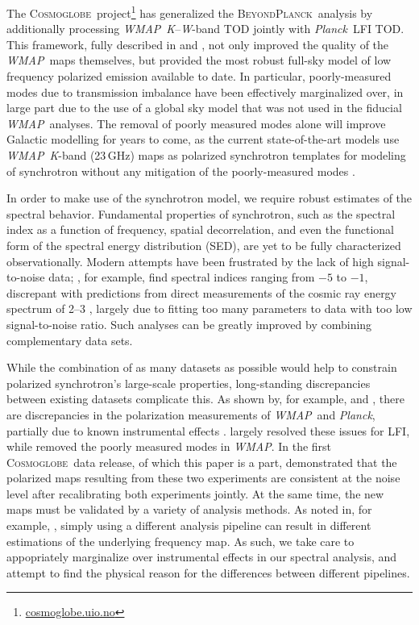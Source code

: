 \documentclass[twocolumn]{../../common/aa}
\def\WMAP{\emph{WMAP}}
\def\Planck{\emph{Planck}}
\newcommand{\bp}{\textsc{BeyondPlanck}}
\newcommand{\cosmoglobe}{\textsc{Cosmoglobe}}
\newcommand{\K}[0]{\textit K}
\newcommand{\W}[0]{\textit W}
\begin{document}
The \cosmoglobe\ project\footnote{\url{cosmoglobe.uio.no}} has generalized the \bp\ analysis by additionally processing \WMAP\ \K--\W-band TOD jointly with \Planck\ LFI TOD. This framework, fully described in \citet{bp17} and \cite{watts2023_dr1},
not only improved the quality of the \WMAP\ maps themselves, but provided the most robust full-sky model of low frequency polarized emission available to date. In particular, poorly-measured modes due to transmission imbalance \citep{jarosik2007} have been effectively marginalized over, in large part due to the use of a global sky model that was not used in the fiducial \WMAP\ analyses. The removal of poorly measured modes alone will improve Galactic modelling for years to come, as the current state-of-the-art models use \WMAP\ \K-band (23\,GHz) maps as polarized synchrotron templates for modeling of synchrotron without any mitigation of the poorly-measured modes \citep{delabrouille2012,pysm2,pysm3}.

In order to make use of the synchrotron model, we require robust estimates of the spectral behavior. Fundamental properties of synchrotron, such as the spectral index as a function of frequency, spatial decorrelation, and even the functional form of the spectral energy distribution (SED), are yet to be fully characterized observationally. Modern attempts have been frustrated by the lack of high signal-to-noise data; \citet{deBelsunce:2022}, for example, find spectral indices ranging from $-5$ to $-1$, discrepant with predictions from direct measurements of the cosmic ray energy spectrum of 2--3 \citep{rybicki,orlando2013,neronov2017}, largely due to fitting too many parameters to data with too low signal-to-noise ratio. Such analyses can be greatly improved by combining complementary data sets.

While the combination of as many datasets as possible would help to constrain polarized synchrotron's large-scale properties, long-standing discrepancies between existing datasets complicate this. As shown by, for example, \citet{planck2014-a12} and \citet{weiland:2018}, there are discrepancies in the polarization measurements of \WMAP\ and \Planck, partially due to known instrumental effects \citep{bennett2012,planck2016-l02}. \citet{bp01} largely resolved these issues for LFI, while \citet{bp17} removed the poorly measured modes in \WMAP. In the first \cosmoglobe\ data release, of which this paper is a part, \citet{watts2023_dr1} demonstrated that the polarized maps resulting from these two experiments are consistent at the noise level after recalibrating both experiments jointly. At the same time, the new maps must be validated by a variety of analysis methods. As noted in, for example, \citet{weiland:2022}, simply using a different analysis pipeline can result in different estimations of the underlying frequency map. As such, we take care to appopriately marginalize over instrumental effects in our spectral analysis, and attempt to find the physical reason for the differences between different pipelines.
\end{document}
